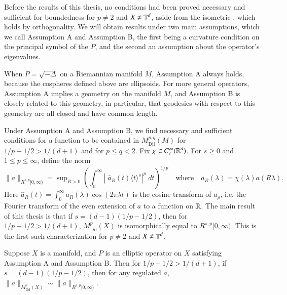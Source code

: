 Before the results of this thesis, no conditions had been proved necessary and sufficient for boundedness for $p \neq 2$ and $X \neq \operatorname{\mathbb{T}}^d$, aside from the isometric , which holds by orthogonality. We will obtain results under two main assumptions, which we call Assumption A and Assumption B, the first being a curvature condition on the principal symbol of the $P$, and the second an assumption about the operator's eigenvalues.

\vspace{0.5em}
\noindent {}

\vspace{0.5em}

\noindent {}

\vspace{0.4em}

When $P = \sqrt{-\Delta}$ on a Riemannian manifold $M$, Assumption A always holds, because the cospheres defined above are ellipsoids. For more general operators, Assumption A implies a geometry on the manifold $M$, and Assumption B is closely related to this geometry, in particular, that geodesics with respect to this geometry are all closed and have common length. 

Under Assumption A and Assumption B, we find necessary and sufficient conditions for a function to be contained in $M^{p,q}_{\text{Dil}}(M)$ for $1/p - 1/2 > 1/(d+1)$ and for $p \leq q < 2$. Fix $\chi \in C_c^\infty(\operatorname{\mathbb{R}}^d)$. For $s \geq 0$ and $1 \leq p \leq \infty$, define the norm
%
\[ \| a \|_{R^{s,p}[0,\infty)} = \sup\nolimits_{R > 0} \left( \int_0^\infty \left|\;\! \widehat{a}_R(t) \langle t \rangle^s \right|^p\; dt \right)^{1/p} \quad\text{where}\quad a_R(\lambda) = \chi(\lambda) a(R \lambda). \]
%
Here $\widehat{a}_R(t) = \int_0^\infty a_R(\lambda) \cos(2 \pi \lambda t)$ is the cosine transform of $a_\rho$, i.e. the Fourier transform of the even extension of $a$ to a function on $\operatorname{\mathbb{R}}$. The main result of this thesis is that if $s = (d-1)(1/p - 1/2)$, then for $1/p - 1/2 > 1/(d+1)$, $M^p_{\text{Dil}}(X)$ is isomorphically equal to $R^{s,p}[0,\infty)$. This is the first such characterization for $p \neq 2$ and $X \neq \operatorname{\mathbb{T}}^d$.

\begin{theorem} \label{maintheorem}
  Suppose $X$ is a manifold, and $P$ is an elliptic operator on $X$ satisfying Assumption A and Assumption B. Then for $1/p - 1/2 > 1/(d+1)$, if $s = (d-1)(1/p - 1/2)$, then for any regulated $a$, $\| a \|_{M^p_{\text{Dil}}(X)} \sim \| a \|_{R^{s,p}[0,\infty)}$.
\end{theorem}

